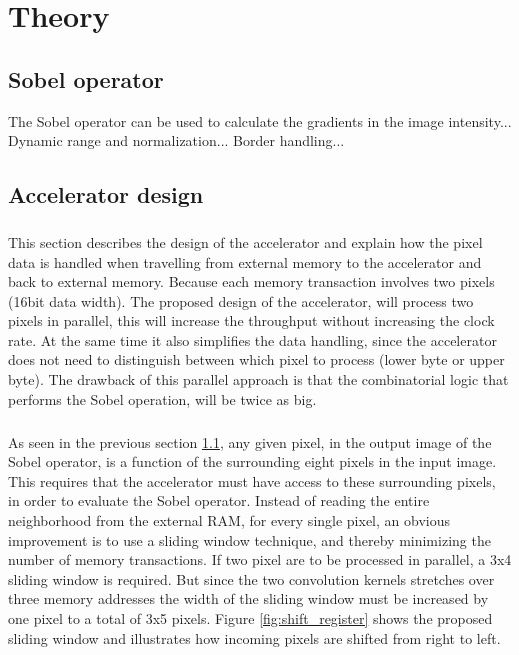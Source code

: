 \chapter{Theory}

\section{Sobel operator}
\label{Sobel}
The Sobel operator can be used to calculate the gradients in the image intensity...
Dynamic range and normalization...
Border handling...

\section{Accelerator design} 
\paragraph*{}
This section describes the design of the accelerator and explain how the pixel data is handled when travelling from external memory to the accelerator and back to external memory. 
Because each memory transaction involves two pixels (16bit data width). The proposed design of the accelerator, will process two pixels in parallel, this will increase the throughput without increasing the clock rate. At the same time it also simplifies the data handling, since the accelerator does not need to distinguish between which pixel to process (lower byte or upper byte). The drawback of this parallel approach is that the combinatorial logic that performs the Sobel operation, will be twice as big.

\paragraph*{}
As seen in the previous section \ref{Sobel}, any given pixel, in the output image of the Sobel operator, is a function of the surrounding eight pixels in the input image. This requires that the accelerator must have access to these surrounding pixels, in order to evaluate the Sobel operator. Instead of reading the entire neighborhood from the external RAM, for every single pixel, an obvious improvement is to use a sliding window technique, and thereby minimizing the number of memory transactions. If two pixel are to be processed in parallel, a 3x4 sliding window is required. But since the two convolution kernels stretches over three memory addresses the width of the sliding window must be increased by one pixel to a total of 3x5 pixels.
Figure \ref{fig:shift_register} shows the proposed sliding window and illustrates how incoming pixels are shifted from right to left.

